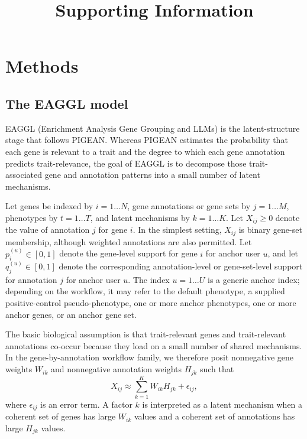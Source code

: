 \documentclass[11pt]{article}
\title{Supporting Information}
\author{}
\begin{document}
\maketitle

\section{Methods}

\subsection{The EAGGL model}

EAGGL (Enrichment Analysis Gene Grouping and LLMs) is the latent-structure stage that follows PIGEAN. Whereas PIGEAN estimates the probability that each gene is relevant to a trait and the degree to which each gene annotation predicts trait-relevance, the goal of EAGGL is to decompose those trait-associated gene and annotation patterns into a small number of latent mechanisms.

Let genes be indexed by $i = 1 \ldots N$, gene annotations or gene sets by $j = 1 \ldots M$, phenotypes by $t = 1 \ldots T$, and latent mechanisms by $k = 1 \ldots K$. Let $X_{ij} \ge 0$ denote the value of annotation $j$ for gene $i$. In the simplest setting, $X_{ij}$ is binary gene-set membership, although weighted annotations are also permitted. Let $p_i^{(u)} \in [0,1]$ denote the gene-level support for gene $i$ for anchor user $u$, and let $q_j^{(u)} \in [0,1]$ denote the corresponding annotation-level or gene-set-level support for annotation $j$ for anchor user $u$. The index $u = 1 \ldots U$ is a generic anchor index; depending on the workflow, it may refer to the default phenotype, a supplied positive-control pseudo-phenotype, one or more anchor phenotypes, one or more anchor genes, or an anchor gene set.

The basic biological assumption is that trait-relevant genes and trait-relevant annotations co-occur because they load on a small number of shared mechanisms. In the gene-by-annotation workflow family, we therefore posit nonnegative gene weights $W_{ik}$ and nonnegative annotation weights $H_{jk}$ such that
\begin{equation}
X_{ij} \approx \sum_{k=1}^K W_{ik} H_{jk} + \epsilon_{ij},
\label{eq:eaggl_basic_factor}
\end{equation}
where $\epsilon_{ij}$ is an error term. A factor $k$ is interpreted as a latent mechanism when a coherent set of genes has large $W_{ik}$ values and a coherent set of annotations has large $H_{jk}$ values.
\end{document}
